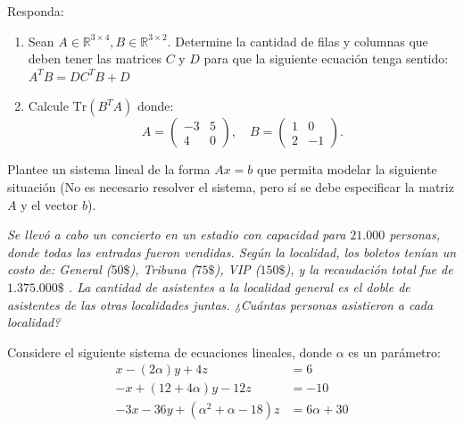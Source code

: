 \documentclass[10pt,a4]{examenEPN0}
\begin{document}
\encabezado
{}
\indicacionesPrueba
\begin{preguntas}
\item Responda:
\begin{enumerate}
    \item Sean \(A\in \mathbb R^{3\times 4}, B\in \mathbb R^{3\times 2}\). Determine la cantidad de filas y columnas que deben tener las matrices \(C\) y \(D\) para que la siguiente ecuación tenga sentido: 
    \(A^TB = DC^TB+D\) 
    \item Calcule \(\text{Tr}(B^TA)\) donde:
    \[A = \left(\begin{array}{cc}
         -3&5  \\
         4&0 
    \end{array}\right),\quad B = \left(\begin{array}{cc}
         1&0  \\
         2&-1 
    \end{array} \right).\]
\end{enumerate}
\par\vfill\newpage



\item Plantee un sistema lineal de la forma \(Ax = b\) que permita modelar la siguiente situación (No es necesario resolver el sistema, pero sí se debe especificar la matriz \(A\) y el vector \(b\)).

\textit{Se llevó a cabo un concierto en un estadio con capacidad para \(21.000\) personas, donde todas las entradas fueron vendidas. Según la localidad, los boletos tenían un costo de: General (\(50\$\)), Tribuna (\(75\$\)), VIP (\(150\$\)), y la recaudación total fue de \(1.375.000\$\) . La cantidad de asistentes a la localidad general es el doble de asistentes de las otras localidades juntas. ¿Cuántas personas asistieron a cada localidad?
}
\par\vfill\newpage




\item Considere el siguiente sistema de ecuaciones lineales, donde \(\alpha\) es un parámetro:
\[
\begin{aligned} 
x - (2\alpha)y + 4z &= 6 \\ 
-x + (12+4\alpha)y  -12z &= -10 \\ 
 -3x-36y 
 + (\alpha^2+\alpha-18)z &= 6\alpha+30
\end{aligned}
\]


\end{preguntas}
\end{document}

